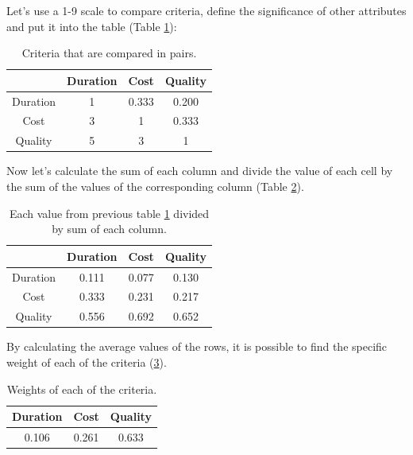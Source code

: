Let's use a 1-9 scale to compare criteria, define the significance of other attributes and put it into the table (Table \ref{tab:ahp-example-1}):

\begin{table}[ht]
\label{tab:ahp-example-1}
    \centering
    \begin{tabular}{|c|c|c|c|}
        \hline
         & Duration & Cost & Quality \\
        \hline
        Duration & 1 & 0.333 & 0.200 \\
        \hline
        Cost & 3 & 1 & 0.333 \\
        \hline
        Quality & 5 & 3 & 1 \\
        \hline
    \end{tabular}
    \caption{Criteria that are compared in pairs.}
\end{table}

Now let's calculate the sum of each column and divide the value of each cell by the sum of the values of the corresponding column (Table \ref{tab:ahp-example-2}).

\begin{table}[ht]
\label{tab:ahp-example-2}
    \centering
    \begin{tabular}{|c|c|c|c|}
        \hline
         & Duration & Cost & Quality \\
        \hline
        Duration & 0.111 & 0.077 & 0.130 \\
        \hline
        Cost & 0.333 & 0.231 & 0.217 \\
        \hline
        Quality & 0.556 & 0.692 & 0.652 \\
        \hline
    \end{tabular}
    \caption{Each value from previous table \ref{tab:ahp-example-1} divided by sum of each column.}
\end{table}

By calculating the average values of the rows, it is possible to find the specific weight of each of the criteria (\ref{tab:ahp-example-3}).

\begin{table}[ht]
\label{tab:ahp-example-3}
    \centering
    \begin{tabular}{|c|c|c|}
        \hline
        Duration & Cost & Quality \\
        \hline
        0.106 & 0.261 & 0.633 \\
        \hline
    \end{tabular}
    \caption{Weights of each of the criteria.}
\end{table}


